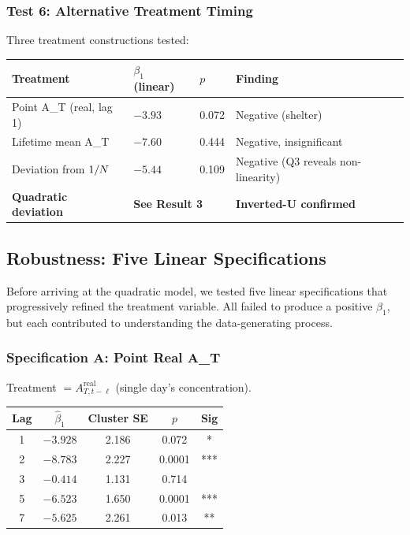 \subsubsection{Test 6: Alternative Treatment Timing}

Three treatment constructions tested:

\begin{center}
\begin{tabular}{@{}llll@{}}
\toprule
Treatment & $\beta_1$ (linear) & $p$ & Finding \\
\midrule
Point A\_T (real, lag 1) & $-3.93$ & 0.072 & Negative (shelter) \\
Lifetime mean A\_T & $-7.60$ & 0.444 & Negative, insignificant \\
Deviation from $1/N$ & $-5.44$ & 0.109 & Negative (Q3 reveals non-linearity) \\
\textbf{Quadratic deviation} & \multicolumn{2}{l}{\textbf{See Result 3}} & \textbf{Inverted-U confirmed} \\
\bottomrule
\end{tabular}
\end{center}


\subsection{Robustness: Five Linear Specifications}\label{subsec:econ-robustness}

Before arriving at the quadratic model, we tested five linear specifications
that progressively refined the treatment variable. All failed to produce a
positive $\beta_1$, but each contributed to understanding the data-generating
process.

\subsubsection{Specification A: Point Real A\_T}

Treatment $= A_{T,t-\ell}^{\text{real}}$ (single day's concentration).

\begin{center}
\begin{tabular}{@{}ccccc@{}}
\toprule
Lag & $\hat{\beta}_1$ & Cluster SE & $p$ & Sig \\
\midrule
1 & $-3.928$ & 2.186 & 0.072 & * \\
2 & $-8.783$ & 2.227 & 0.0001 & *** \\
3 & $-0.414$ & 1.131 & 0.714 & \\
5 & $-6.523$ & 1.650 & 0.0001 & *** \\
7 & $-5.625$ & 2.261 & 0.013 & ** \\
\bottomrule
\end{tabular}
\end{center}

